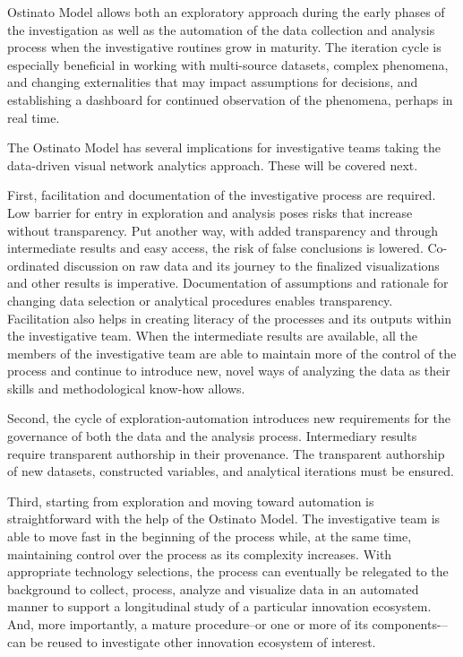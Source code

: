 Ostinato Model allows both an exploratory approach during the early phases of the investigation as well as the automation of the data collection and analysis process when the investigative routines grow in maturity. The iteration cycle is especially beneficial in working with multi-source datasets, complex phenomena, and changing externalities that may impact assumptions for decisions, and establishing a dashboard for continued observation of the phenomena, perhaps in real time.

The Ostinato Model has several implications for investigative teams taking the data-driven visual network analytics approach. These will be covered next.

First, facilitation and documentation of the investigative process are required. Low barrier for entry in exploration and analysis poses risks that increase without transparency. Put another way, with added transparency and through intermediate results and easy access, the risk of false conclusions is lowered. Co-ordinated discussion on raw data and its journey to the finalized visualizations and other results is imperative. Documentation of assumptions and rationale for changing data selection or analytical procedures enables transparency. Facilitation also helps in creating literacy of the processes and its outputs within the investigative team. When the intermediate results are available, all the members of the investigative team are able to maintain more of the control of the process and continue to introduce new, novel ways of analyzing the data as their skills and methodological know-how allows.

Second, the cycle of exploration-automation introduces new requirements for the governance of both the data and the analysis process. Intermediary results require transparent authorship in their provenance. The transparent authorship of new datasets, constructed variables, and analytical iterations must be ensured.

Third, starting from exploration and moving toward automation is straightforward with the help of the Ostinato Model. The investigative team is able to move fast in the beginning of the process while, at the same time, maintaining control over the process as its complexity increases. With appropriate technology selections, the process can eventually be relegated to the background to collect, process, analyze and visualize data in an automated manner to support a longitudinal study of a particular innovation ecosystem. And, more importantly, a mature procedure--or one or more of its components-–can be reused to investigate other innovation ecosystem of interest.

